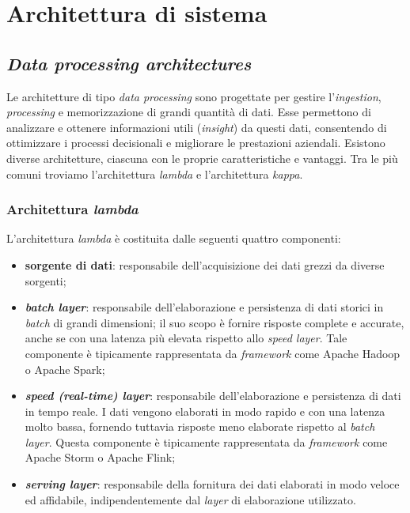 \section{Architettura di sistema}

\subsection{\textit{Data processing architectures}}
Le architetture di tipo \textit{data processing} sono progettate per gestire l'\textit{ingestion}, \textit{processing} e memorizzazione di grandi quantità di dati.
Esse permettono di analizzare e ottenere informazioni utili (\textit{insight}) da questi dati, consentendo di ottimizzare i processi decisionali e migliorare le prestazioni aziendali.
Esistono diverse architetture, ciascuna con le proprie caratteristiche e vantaggi. Tra le più comuni troviamo l'architettura \textit{lambda} e l'architettura \textit{kappa}.

\subsubsection{Architettura \textit{lambda}}
L'architettura \textit{lambda} è costituita dalle seguenti quattro componenti:
\begin{itemize}
	\item \textbf{sorgente di dati}: responsabile dell'acquisizione dei dati grezzi da diverse sorgenti;
	\item \textbf{\textit{batch layer}}: responsabile dell'elaborazione e persistenza di dati storici in \textit{batch} di grandi dimensioni; il suo scopo è fornire risposte complete e accurate, anche se con una latenza più elevata rispetto allo \textit{speed layer}. Tale componente è tipicamente rappresentata da \textit{framework} come Apache Hadoop o Apache Spark;
	\item \textbf{\textit{speed (real-time) layer}}: responsabile dell'elaborazione e persistenza di dati in tempo reale. I dati vengono elaborati in modo rapido e con una latenza molto bassa, fornendo tuttavia risposte meno elaborate rispetto al \textit{batch layer}. Questa componente è tipicamente rappresentata da \textit{framework} come Apache Storm o Apache Flink;
	\item \textbf{\textit{serving layer}}: responsabile della fornitura dei dati elaborati in modo veloce ed affidabile, indipendentemente dal \textit{layer} di elaborazione utilizzato.
\end{itemize}

